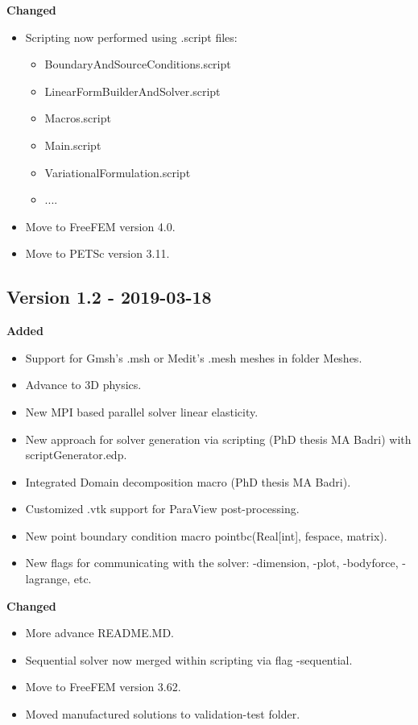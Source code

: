 \documentclass{report}
\begin{document}
\textbf{Changed}
\begin{itemize}
 \item Scripting now performed using {\ttfamily .script} files:
 \begin{itemize}
	\item {\ttfamily BoundaryAndSourceConditions.script}
	\item {\ttfamily LinearFormBuilderAndSolver.script}
	\item {\ttfamily Macros.script} 
	\item {\ttfamily Main.script} 
	\item {\ttfamily VariationalFormulation.script} 
	\item ....
	\end{itemize}
\item Move to FreeFEM version 4.0.
\item Move to PETSc version 3.11.
\end{itemize}

\subsection{Version 1.2 - 2019-03-18}

\textbf{Added}
\begin{itemize}
\item Support for Gmsh's {\ttfamily .msh}  or Medit's {\ttfamily .mesh} meshes in folder {\ttfamily Meshes}.
\item Advance to 3D physics.
\item New MPI based parallel solver linear elasticity.
\item New approach for solver generation via scripting (PhD thesis MA Badri) with {\ttfamily scriptGenerator.edp}.
\item Integrated Domain decomposition macro (PhD thesis MA Badri).
\item Customized {\ttfamily .vtk} support for ParaView post-processing.
\item New point boundary condition macro {\ttfamily pointbc(Real[int], fespace, matrix)}.
\item New flags for communicating with the solver: {\ttfamily -dimension}, {\ttfamily -plot}, {\ttfamily -bodyforce}, {\ttfamily -lagrange}, etc.
\end{itemize}

\textbf{Changed}
\begin{itemize}
\item More advance README.MD.
\item Sequential solver now merged within scripting via flag {\ttfamily -sequential}.
\item Move to FreeFEM version 3.62.
\item Moved manufactured solutions to {\ttfamily validation-test} folder.
\end{itemize}
\end{document}
